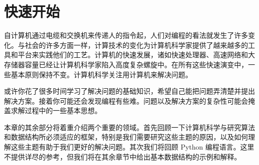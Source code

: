 \section{快速开始}

\begin{frame}\ft{\secname}
自计算机通过电缆和交换机来传递人的指令起，人们对编程的看法就发生了许多变化。与社会的许多方面一样，计算技术的变化为计算机科学家提供了越来越多的工具和平台来实践他们的工艺。计算机的快速发展，诸如快速处理器、高速网络和大存储器容量已经让计算机科学家陷入高度复杂螺旋中。在所有这些快速演变中，一些基本原则保持不变。计算机科学关注用计算机来解决问题。
\end{frame}


\begin{frame}\ft{\secname}
或许你花了很多时间学习了解决问题的基础知识，希望自己能把问题弄清楚并提出解决方案。接着你可能还会发现编程有些难。问题以及解决方案的复杂性可能会掩盖求解过程中的一些基本思想。
\end{frame}


\begin{frame}\ft{\secname}


本章的其余部分将着重介绍两个重要的领域。首先回顾一下计算机科学与研究算法和数据结构所必须适应的框架，特别是我们需要研究这些主题的原因，以及如何理解这些主题有助于我们更好的解决问题。其次我们将回顾 Python 编程语言。这里不提供详尽的参考，但我们将在其余章节中给出基本数据结构的示例和解释。 
\end{frame}

